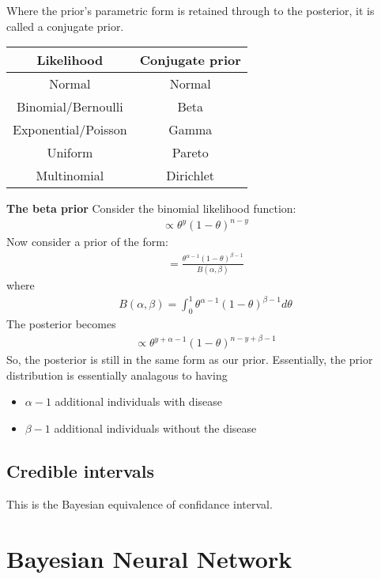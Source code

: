 \documentclass[11pt, oneside, reqno]{amsart}
\numberwithin{equation}{section}
\theoremstyle{plain}%
\theoremstyle{definition}
\theoremstyle{remark}
\begin{document}
Where the prior's parametric form is retained through to the posterior, it is called a conjugate prior.

\begin{center}
 \begin{tabular}{|c|c|} 
 \hline
 Likelihood & Conjugate prior  \\ [0.5ex] 
 \hline
 Normal & Normal \\ 
 \hline
 Binomial/Bernoulli & Beta \\
 \hline
Exponential/Poisson & Gamma \\
 \hline
 Uniform & Pareto \\
 \hline
 Multinomial & Dirichlet \\ [1ex] 
 \hline
\end{tabular}
\end{center}

\textbf{The beta prior}
Consider the binomial likelihood function:
\begin{align*}
	[y|\theta]\propto\theta^y(1-\theta)^{n-y}
\end{align*}
Now consider a prior of the form:
\begin{align*}
	[\theta]=\frac{\theta^{\alpha-1}(1-\theta)^{\beta-1}}{B(\alpha,\beta)}
\end{align*}
where 
\begin{align*}
	B(\alpha,\beta)=\int^1_0\theta^{\alpha-1}(1-\theta)^{\beta-1}d\theta
\end{align*}
The posterior becomes
\begin{align*}
	[\theta|y]\propto\theta^{y+\alpha-1}(1-\theta)^{n-y+\beta-1}
\end{align*}
So, the posterior is still in the same form as our prior. Essentially, the prior distribution is essentially analagous to having
\begin{itemize}
	\item $\alpha-1$ additional individuals with disease
	\item $\beta-1$ additional individuals without the disease
\end{itemize}
\subsection{Credible intervals}
This is the Bayesian equivalence of confidance interval.
\section{Bayesian Neural Network}
\end{document}
